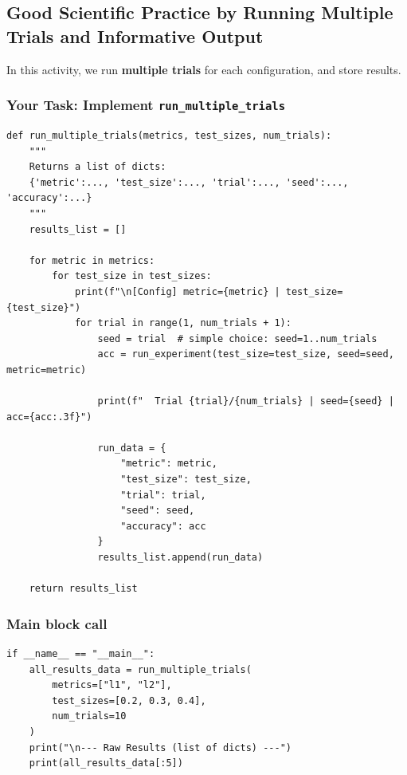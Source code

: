 \newpage
\subsection{Good Scientific Practice by Running Multiple Trials and Informative Output}
\label{sec:activity3_multipletrials}

In this activity, we run \textbf{multiple trials} for each configuration, and store results.

\subsubsection{Your Task: Implement \texttt{run\_multiple\_trials}}
\label{subsubsec:implement_run_multiple_trials}

\begin{verbatim}
def run_multiple_trials(metrics, test_sizes, num_trials):
    """
    Returns a list of dicts:
    {'metric':..., 'test_size':..., 'trial':..., 'seed':..., 'accuracy':...}
    """
    results_list = []

    for metric in metrics:
        for test_size in test_sizes:
            print(f"\n[Config] metric={metric} | test_size={test_size}")
            for trial in range(1, num_trials + 1):
                seed = trial  # simple choice: seed=1..num_trials
                acc = run_experiment(test_size=test_size, seed=seed, metric=metric)

                print(f"  Trial {trial}/{num_trials} | seed={seed} | acc={acc:.3f}")

                run_data = {
                    "metric": metric,
                    "test_size": test_size,
                    "trial": trial,
                    "seed": seed,
                    "accuracy": acc
                }
                results_list.append(run_data)

    return results_list
\end{verbatim}

\subsubsection{Main block call}
\begin{verbatim}
if __name__ == "__main__":
    all_results_data = run_multiple_trials(
        metrics=["l1", "l2"],
        test_sizes=[0.2, 0.3, 0.4],
        num_trials=10
    )
    print("\n--- Raw Results (list of dicts) ---")
    print(all_results_data[:5])
\end{verbatim}

